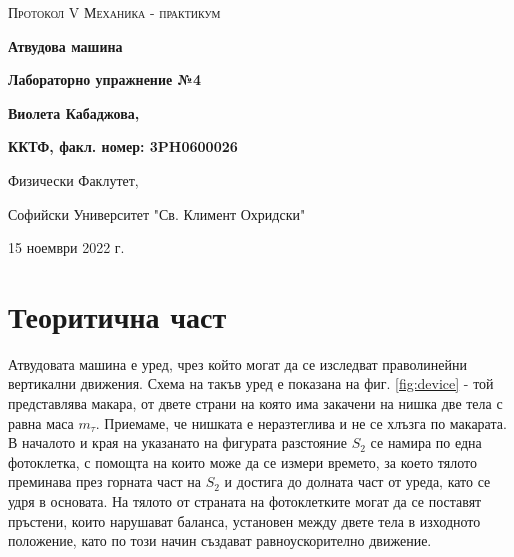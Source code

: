 \documentclass[12pt]{article}
\begin{document}
\begin{titlepage}
	\flushleft
	{\scshape\Large Протокол V \hspace{2cm} Механика - практикум\par}
	\vspace{5cm}
	{\huge\bfseries Атвудова машина\par}
	\vspace{1cm}
	{\LARGE\bfseries Лабораторно упражнение №4\par}
	\vspace{5cm}
    {\LARGE\bfseries Виолета Кабаджова, \par}
    {\large\bfseries ККТФ, факл. номер: 3PH0600026\par}
	\vspace{1cm}
	
	{\large Физически Факлутет, 
	
	Софийски Университет "Св. Климент Охридски"
	
	15 ноември 2022 г.\par}
	
\end{titlepage}

\section{Теоритична част}\label{sec:theoretical-part}
Атвудовата машина е уред, чрез който могат да се изследват праволинейни вертикални движения. Схема на такъв уред е показана на фиг. \ref{fig:device} - той представлява макара, от двете страни на която има закачени на нишка две тела с равна маса $m_\tau$. Приемаме, че нишката е неразтеглива и не се хлъзга по макарата. В началото и края на указанато на фигурата разстояние $S_2$ се намира по една фотоклетка, с помощта на които може да се измери времето, за което тялото преминава през горната част на $S_2$ и достига до долната част от уреда, като се удря в основата. На тялото от страната на фотоклетките могат да се поставят пръстени, които нарушават баланса, установен между двете тела в изходното положение, като по този начин създават равноускорително движение.
\end{document}
